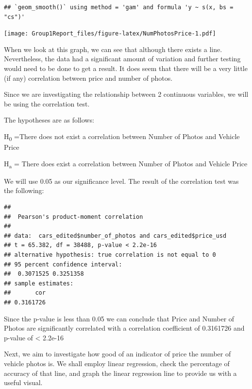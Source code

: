 \documentclass[
]{article}
\newenvironment{Shaded}{\begin{snugshade}}{\end{snugshade}}
\newcommand{\CommentTok}[1]{\textcolor[rgb]{0.56,0.35,0.01}{\textit{#1}}}
\newcommand{\FunctionTok}[1]{\textcolor[rgb]{0.00,0.00,0.00}{#1}}
\newcommand{\NormalTok}[1]{#1}
\newcommand{\SpecialCharTok}[1]{\textcolor[rgb]{0.00,0.00,0.00}{#1}}
\begin{document}
\begin{verbatim}
## `geom_smooth()` using method = 'gam' and formula 'y ~ s(x, bs = "cs")'
\end{verbatim}

\texttt{[image: Group1Report\_files/figure-latex/NumPhotosPrice-1.pdf]}

When we look at this graph, we can see that although there exists a
line. Nevertheless, the data had a significant amount of variation and
further testing would need to be done to get a result. It does seem that
there will be a very little (if any) correlation between price and
number of photos.

Since we are investigating the relationship between 2 continuous
variables, we will be using the correlation test.

The hypotheses are as follows:

H\textsubscript{0} =There does not exist a correlation between Number of
Photos and Vehicle Price

H\textsubscript{a} = There does exist a correlation between Number of
Photos and Vehicle Price

We will use 0.05 as our significance level. The result of the
correlation test was the following:

\begin{Shaded}
\end{Shaded}

\begin{verbatim}
## 
##  Pearson's product-moment correlation
## 
## data:  cars_edited$number_of_photos and cars_edited$price_usd
## t = 65.382, df = 38488, p-value < 2.2e-16
## alternative hypothesis: true correlation is not equal to 0
## 95 percent confidence interval:
##  0.3071525 0.3251358
## sample estimates:
##       cor 
## 0.3161726
\end{verbatim}

Since the p-value is less than 0.05 we can conclude that Price and
Number of Photos are significantly correlated with a correlation
coefficient of 0.3161726 and p-value of \textless{} 2.2e-16

Next, we aim to investigate how good of an indicator of price the number
of vehicle photos is. We shall employ linear regression, check the
percentage of accuracy of that line, and graph the linear regression
line to provide us with a useful visual.
\end{document}
